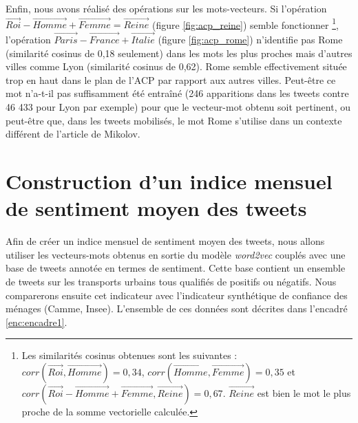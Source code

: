 \documentclass[11pt,french,french]{article}
\let\rmarkdownfootnote\footnote%
\def\footnote{\protect\rmarkdownfootnote}
\begin{document}
Enfin, nous avons réalisé des opérations sur les mots-vecteurs. Si
l'opération
\(\overrightarrow{Roi} - \overrightarrow{Homme} + \overrightarrow{Femme} = \overrightarrow{Reine}\)
(figure \ref{fig:acp_reine}) semble fonctionner \footnote{Les
  similarités cosinus obtenues sont les suivantes :
  \(corr(\overrightarrow{Roi}, \overrightarrow{Homme}) = 0,34\),
  \(corr(\overrightarrow{Homme}, \overrightarrow{Femme}) = 0,35\) et
  \(corr(\overrightarrow{Roi} - \overrightarrow{Homme} + \overrightarrow{Femme} , \overrightarrow{Reine}) = 0,67\).
  \(\overrightarrow{Reine}\) est bien le mot le plus proche de la somme
  vectorielle calculée.}, l'opération
\(\overrightarrow{Paris} - \overrightarrow{France} + \overrightarrow{Italie}\)
(figure \ref{fig:acp_rome}) n'identifie pas \og Rome \fg{} (similarité
cosinus de 0,18 seulement) dans les mots les plus proches mais d'autres
villes comme \og Lyon \fg{} (similarité cosinus de 0,62). \og Rome \fg{}
semble effectivement située \og trop en haut\fg{} dans le plan de l'ACP
par rapport aux autres villes. Peut-être ce mot n'a-t-il pas
suffisamment été entraîné (246 apparitions dans les tweets contre 46 433
pour Lyon par exemple) pour que le vecteur-mot obtenu soit pertinent, ou
peut-être que, dans les tweets mobilisés, le mot \og Rome \fg{}
s'utilise dans un contexte différent de l'article de Mikolov.

\section{Construction d'un indice mensuel de sentiment moyen des
tweets}\label{sec:sentimentalAnalysis}

Afin de créer un indice mensuel de sentiment moyen des tweets, nous
allons utiliser les vecteurs-mots obtenus en sortie du modèle
\emph{word2vec} couplés avec une base de tweets annotée en termes de
sentiment. Cette base contient un ensemble de tweets sur les transports
urbains tous qualifiés de positifs ou négatifs. Nous comparerons ensuite
cet indicateur avec l'indicateur synthétique de confiance des ménages
(Camme, Insee). L'ensemble de ces données sont décrites dans l'encadré
\ref{enc:encadre1}.
\end{document}

